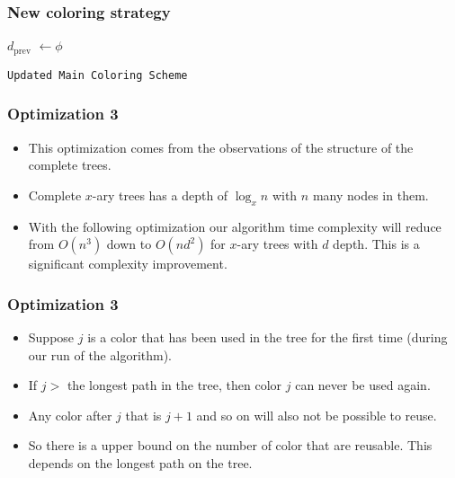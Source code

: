 \begin{frame}
    \frametitle{New coloring strategy}

    \begin{algorithm}[H]
         {
            $d_{\text{prev}}$ $\gets \phi$\;
             {
            }
        }
        \caption{\texttt{Updated Main Coloring Scheme}}
    \end{algorithm}
    
\end{frame}


\begin{frame}
    \frametitle{Optimization 3}

    
    \begin{itemize}
        \item This optimization comes from the observations of the structure of the complete trees.\pause
        \item Complete $x$-ary trees has a depth of $\log_{x} n$ with $n$ many nodes in them.\pause[]
        \item With the following optimization our algorithm time complexity will reduce from $O(n^3)$ down to $O(n d^2)$ for $x$-ary trees with $d$ depth. This is a significant complexity improvement.
    \end{itemize}

\end{frame}

\begin{frame}
    \frametitle{Optimization 3}
    \begin{itemize}
        \item Suppose $j$ is a color that has been used in the tree for the first time (during our run of the algorithm).\pause[] 
        \item If $j >$ the longest path in the tree, then color $j$ can never be used again.\pause[]
        \item Any color after $j$ that is $j + 1$ and so on will also not be possible to reuse.\pause[]
        \item So there is a upper bound on the number of color that are reusable. This depends on the longest path on the tree.
    \end{itemize}    

\end{frame}


